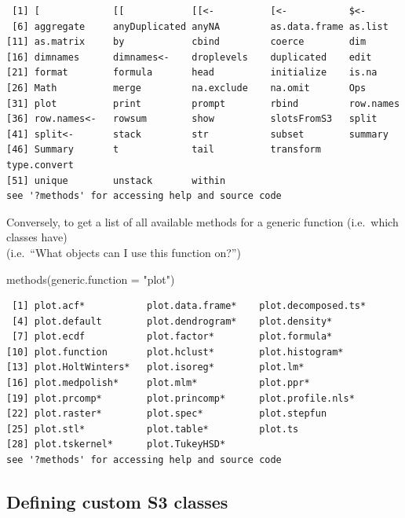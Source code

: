 \documentclass[
]{book}
\newenvironment{Shaded}{\begin{snugshade}}{\end{snugshade}}
\newcommand{\AttributeTok}[1]{\textcolor[rgb]{0.77,0.63,0.00}{#1}}
\newcommand{\FunctionTok}[1]{\textcolor[rgb]{0.00,0.00,0.00}{#1}}
\newcommand{\NormalTok}[1]{#1}
\newcommand{\StringTok}[1]{\textcolor[rgb]{0.31,0.60,0.02}{#1}}
\begin{document}
\begin{verbatim}
 [1] [             [[            [[<-          [<-           $<-          
 [6] aggregate     anyDuplicated anyNA         as.data.frame as.list      
[11] as.matrix     by            cbind         coerce        dim          
[16] dimnames      dimnames<-    droplevels    duplicated    edit         
[21] format        formula       head          initialize    is.na        
[26] Math          merge         na.exclude    na.omit       Ops          
[31] plot          print         prompt        rbind         row.names    
[36] row.names<-   rowsum        show          slotsFromS3   split        
[41] split<-       stack         str           subset        summary      
[46] Summary       t             tail          transform     type.convert 
[51] unique        unstack       within       
see '?methods' for accessing help and source code
\end{verbatim}

Conversely, to get a list of all available methods for a generic function (i.e.~which classes have)\\
(i.e.~``What objects can I use this function on?'')

\begin{Shaded}
\begin{Highlighting}[]
\FunctionTok{methods}\NormalTok{(}\AttributeTok{generic.function =} \StringTok{"plot"}\NormalTok{)}
\end{Highlighting}
\end{Shaded}

\begin{verbatim}
 [1] plot.acf*           plot.data.frame*    plot.decomposed.ts*
 [4] plot.default        plot.dendrogram*    plot.density*      
 [7] plot.ecdf           plot.factor*        plot.formula*      
[10] plot.function       plot.hclust*        plot.histogram*    
[13] plot.HoltWinters*   plot.isoreg*        plot.lm*           
[16] plot.medpolish*     plot.mlm*           plot.ppr*          
[19] plot.prcomp*        plot.princomp*      plot.profile.nls*  
[22] plot.raster*        plot.spec*          plot.stepfun       
[25] plot.stl*           plot.table*         plot.ts            
[28] plot.tskernel*      plot.TukeyHSD*     
see '?methods' for accessing help and source code
\end{verbatim}

\hypertarget{defining-custom-s3-classes}{%
\subsection{Defining custom S3 classes}\label{defining-custom-s3-classes}}
\end{document}
